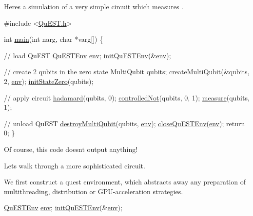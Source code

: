 Here\textquotesingle{}s a simulation of a very simple circuit which measures . 
\begin{DoxyCode}
\textcolor{preprocessor}{#include <\mbox{\hyperlink{QuEST_8h}{QuEST.h}}>}

\textcolor{keywordtype}{int} \mbox{\hyperlink{bernstein__vazirani__circuit_8c_a0b1907e3d123f469a739aa425bd05574}{main}}(\textcolor{keywordtype}{int} narg, \textcolor{keywordtype}{char} *varg[]) \{

  \textcolor{comment}{// load QuEST}
  \mbox{\hyperlink{structQuESTEnv}{QuESTEnv}} \mbox{\hyperlink{runTests_8c_a5fd8ba97fcae3408ae6221dfc3cc1f93}{env}};
  \mbox{\hyperlink{QuEST__env__local_8c_ad84a3ce68d1ca02b4e3f741ea45b6054}{initQuESTEnv}}(&\mbox{\hyperlink{runTests_8c_a5fd8ba97fcae3408ae6221dfc3cc1f93}{env}});

  \textcolor{comment}{// create 2 qubits in the zero state}
  \mbox{\hyperlink{structMultiQubit}{MultiQubit}} qubits; 
  \mbox{\hyperlink{QuEST_8c_a9c02591bc64c2918503afa231d90d83f}{createMultiQubit}}(&qubits, 2, \mbox{\hyperlink{runTests_8c_a5fd8ba97fcae3408ae6221dfc3cc1f93}{env}});
  \mbox{\hyperlink{QuEST_8c_a9ba8171c9ec5c42202b144026527e9ec}{initStateZero}}(qubits);

  \textcolor{comment}{// apply circuit}
  \mbox{\hyperlink{QuEST__env__local_8c_aa09b5dd93de6df1384b8f2c0041749ab}{hadamard}}(qubits, 0);
  \mbox{\hyperlink{QuEST__env__local_8c_a67576895bbc65463481a8ea24d9b1e22}{controlledNot}}(qubits, 0, 1);
  \mbox{\hyperlink{QuEST__env__local_8c_ad5774247d836267175c664cd0e451bcb}{measure}}(qubits, 1);

  \textcolor{comment}{// unload QuEST}
  \mbox{\hyperlink{QuEST_8c_ae5d6acc322314d7a3d8a2eccf00d3b19}{destroyMultiQubit}}(qubits, \mbox{\hyperlink{runTests_8c_a5fd8ba97fcae3408ae6221dfc3cc1f93}{env}}); 
  \mbox{\hyperlink{QuEST__env__local_8c_abd4bc926cd3f9b65610bb228d0c59fe0}{closeQuESTEnv}}(\mbox{\hyperlink{runTests_8c_a5fd8ba97fcae3408ae6221dfc3cc1f93}{env}});
  \textcolor{keywordflow}{return} 0;
\}
\end{DoxyCode}
 Of course, this code doesn\textquotesingle{}t output anything!





Let\textquotesingle{}s walk through a more sophisticated circuit.

We first construct a quest environment, which abstracts away any preparation of multithreading, distribution or G\+P\+U-\/acceleration strategies. 
\begin{DoxyCode}
\mbox{\hyperlink{structQuESTEnv}{QuESTEnv}} \mbox{\hyperlink{runTests_8c_a5fd8ba97fcae3408ae6221dfc3cc1f93}{env}};
\mbox{\hyperlink{QuEST__env__local_8c_ad84a3ce68d1ca02b4e3f741ea45b6054}{initQuESTEnv}}(&\mbox{\hyperlink{runTests_8c_a5fd8ba97fcae3408ae6221dfc3cc1f93}{env}});
\end{DoxyCode}


